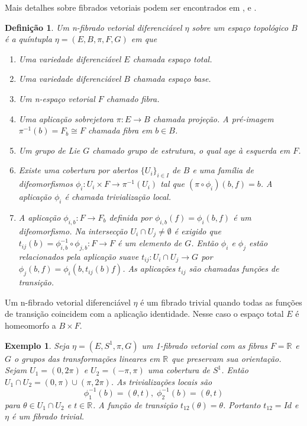 \documentclass[12pt]{book}
\newtheorem{definicao}[teorema]{Definição}
\newtheorem{exemplo}[teorema]{Exemplo}
\newcommand{\circulo}{S^{1}}
\newcommand{\real}[1]{\mathbb{R}^{#1}}
\newcommand{\reta}{\real{}}
\begin{document}
	Mais detalhes sobre fibrados vetoriais podem ser encontrados em \cite{husemoller_fibrados}, \cite{nakahara} e \cite{steenrod_fibre_bundles}.
	
	\begin{definicao}
		Um n-fibrado vetorial diferenciável $\eta$ sobre um espaço topológico $B$ é a quíntupla $\eta = (E, B, \pi, F, G)$ em que
		
		\begin{enumerate}
			\item Uma variedade diferenciável $E$ chamada espaço total.
			
			\item Uma variedade diferenciável $B$ chamada espaço base.
			
			\item Um n-espaço vetorial $F$ chamado fibra.
			
			\item Uma aplicação sobrejetora $\pi: E\to B$ chamada projeção. A pré-imagem $\pi^{-1}(b) = F_{b} \cong F$ chamada fibra em $b\in B$. 
			
			\item Um grupo de Lie $G$ chamado grupo de estrutura, o qual age à esquerda em $F$.
			
			\item Existe uma cobertura por abertos $\{U_{i}\}_{i\in I}$ de $B$ e uma família de difeomorfismos $\phi_{i}: U_{i}\times F\to \pi^{-1}(U_{i})$ tal que $(\pi\circ \phi_{i})(b,f) = b$. A aplicação $\phi_{i}$ é chamada trivialização local.
			
			\item A aplicação $\phi_{i,b}: F\to F_{b}$ definida por $\phi_{i,b}(f) = \phi_{i}(b,f)$ é um difeomorfismo. Na intersecção $U_{i}\cap U_{j}\neq \emptyset$ é exigido que $t_{ij}(b)=\phi_{i,b}^{-1}\circ \phi_{j,b}:F\to F$ é um elemento de $G$. Então $\phi_{i}$ e $\phi_{j}$ estão relacionados pela aplicação suave $t_{ij}: U_{i}\cap U_{j}\to G$ por $\phi_{j}(b, f) = \phi_{i}(b, t_{ij}(b)f)$. As aplicações $t_{ij}$ são chamadas funções de transição.
		\end{enumerate}
		
	\end{definicao}
	
	Um n-fibrado vetorial diferenciável $\eta$ é um fibrado trivial quando todas as funções de transição coincidem com a aplicação identidade. Nesse caso o espaço total $E$ é homeomorfo a $B\times F$.
	
	\begin{exemplo}\label{exemplo_fibrado_circulo}
		Seja $\eta=(E, \circulo,\pi, G)$ um 1-fibrado vetorial com as fibras $F=\reta$ e $G$ o grupos das transformações lineares em $\reta$ que preservam sua orientação. Sejam $U_{1} = (0,2\pi)$ e $U_{2} = (-\pi,\pi)$ uma cobertura de $\circulo$. Então $U_{1}\cap U_{2} =(0,\pi)\cup(\pi,2\pi)$. As trivializações locais são 
		$$
		\phi^{-1}_{1}(b) = (\theta, t),\; 		\phi^{-1}_{2}(b) = (\theta, t)
		$$
		para $\theta\in U_{1}\cap U_{2}$ e $t\in \reta$. A função de transição $t_{12}(\theta) = \theta$. Portanto $t_{12}=Id$ e $\eta$ é um fibrado trivial.
	\end{exemplo}
	
\end{document}
